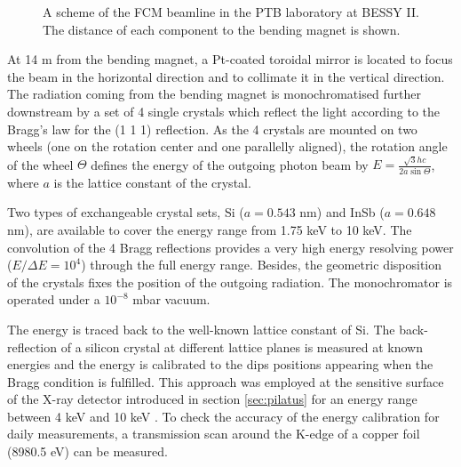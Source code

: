 \begin{figure}%
	\centering
		\caption[Diagram of the Four-crystal monochromator beamline.]{A scheme of the FCM beamline in the PTB laboratory at BESSY II. The distance of each component to the bending magnet is shown.}
		\label{fig:FCMScheme}
\end{figure}

At 14 m from the bending magnet, a Pt-coated toroidal mirror is located to focus the beam in the horizontal direction and to collimate it in the vertical direction. The radiation coming from the bending magnet is monochromatised further downstream by a set of 4 single crystals which reflect the light according to the Bragg's law for the (1 1 1) reflection. As the 4 crystals are mounted on two wheels (one on the rotation center and one parallelly aligned), the rotation angle of the wheel $\Theta$ defines the energy of the outgoing photon beam by $E=\frac{\sqrt{3}h c}{2a\sin{\Theta}}$, where $a$ is the lattice constant of the crystal.

Two types of exchangeable crystal sets, Si ($a=0.543$ nm) and InSb ($a=0.648$ nm), are available to cover the energy range from 1.75 keV to 10 keV. The convolution of the 4 Bragg reflections provides a very high energy resolving power ($E/\Delta E = 10^4 $) through the full energy range. Besides, the geometric disposition of the crystals fixes the position of the outgoing radiation. The monochromator is operated under a $10^{-8}$ mbar vacuum.

The energy is traced back to the well-known lattice constant of Si. The back-reflection of a silicon crystal at different lattice planes is measured at known energies and the energy is calibrated to the dips positions appearing when the Bragg condition is fulfilled. This approach was employed at the sensitive surface of the X-ray detector introduced in section \ref{sec:pilatus} for an energy range between 4 keV and 10 keV \citep{gollwitzer_diffraction_2014}. To check the accuracy of the energy calibration for daily measurements, a transmission scan around the K-edge of a copper foil (8980.5 eV) can be measured.

